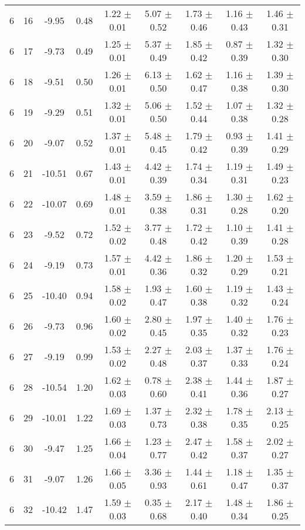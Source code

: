 \begin{landscape}
\begin{longtable}{ccccccccc}
   6 & 16 & -9.95 & 0.48 & 1.22 $\pm$ 0.01 & 5.07 $\pm$ 0.52 & 1.73 $\pm$ 0.46 & 1.16 $\pm$ 0.43 & 1.46 $\pm$ 0.31\\
   6 & 17 & -9.73 & 0.49 & 1.25 $\pm$ 0.01 & 5.37 $\pm$ 0.49 & 1.85 $\pm$ 0.42 & 0.87 $\pm$ 0.39 & 1.32 $\pm$ 0.30\\
   6 & 18 & -9.51 & 0.50 & 1.26 $\pm$ 0.01 & 6.13 $\pm$ 0.50 & 1.62 $\pm$ 0.47 & 1.16 $\pm$ 0.38 & 1.39 $\pm$ 0.30\\
   6 & 19 & -9.29 & 0.51 & 1.32 $\pm$ 0.01 & 5.06 $\pm$ 0.50 & 1.52 $\pm$ 0.44 & 1.07 $\pm$ 0.38 & 1.32 $\pm$ 0.28\\
   6 & 20 & -9.07 & 0.52 & 1.37 $\pm$ 0.01 & 5.48 $\pm$ 0.45 & 1.79 $\pm$ 0.42 & 0.93 $\pm$ 0.39 & 1.41 $\pm$ 0.29\\
   6 & 21 & -10.51 & 0.67 & 1.43 $\pm$ 0.01 & 4.42 $\pm$ 0.39 & 1.74 $\pm$ 0.34 & 1.19 $\pm$ 0.31 & 1.49 $\pm$ 0.23\\
   6 & 22 & -10.07 & 0.69 & 1.48 $\pm$ 0.01 & 3.59 $\pm$ 0.38 & 1.86 $\pm$ 0.31 & 1.30 $\pm$ 0.28 & 1.62 $\pm$ 0.20\\
   6 & 23 & -9.52 & 0.72 & 1.52 $\pm$ 0.02 & 3.77 $\pm$ 0.48 & 1.72 $\pm$ 0.42 & 1.10 $\pm$ 0.39 & 1.41 $\pm$ 0.28\\
   6 & 24 & -9.19 & 0.73 & 1.57 $\pm$ 0.01 & 4.42 $\pm$ 0.36 & 1.86 $\pm$ 0.32 & 1.20 $\pm$ 0.29 & 1.53 $\pm$ 0.21\\
   6 & 25 & -10.40 & 0.94 & 1.58 $\pm$ 0.02 & 1.93 $\pm$ 0.47 & 1.60 $\pm$ 0.38 & 1.19 $\pm$ 0.32 & 1.43 $\pm$ 0.24\\
   6 & 26 & -9.73 & 0.96 & 1.60 $\pm$ 0.02 & 2.80 $\pm$ 0.45 & 1.97 $\pm$ 0.35 & 1.40 $\pm$ 0.32 & 1.76 $\pm$ 0.23\\
   6 & 27 & -9.19 & 0.99 & 1.53 $\pm$ 0.02 & 2.27 $\pm$ 0.48 & 2.03 $\pm$ 0.37 & 1.37 $\pm$ 0.33 & 1.76 $\pm$ 0.24\\
   6 & 28 & -10.54 & 1.20 & 1.62 $\pm$ 0.03 & 0.78 $\pm$ 0.60 & 2.38 $\pm$ 0.41 & 1.44 $\pm$ 0.36 & 1.87 $\pm$ 0.27\\
   6 & 29 & -10.01 & 1.22 & 1.69 $\pm$ 0.03 & 1.37 $\pm$ 0.73 & 2.32 $\pm$ 0.38 & 1.78 $\pm$ 0.35 & 2.13 $\pm$ 0.25\\
   6 & 30 & -9.47 & 1.25 & 1.66 $\pm$ 0.04 & 1.23 $\pm$ 0.77 & 2.47 $\pm$ 0.42 & 1.58 $\pm$ 0.37 & 2.02 $\pm$ 0.27\\
   6 & 31 & -9.07 & 1.26 & 1.66 $\pm$ 0.05 & 3.36 $\pm$ 0.93 & 1.44 $\pm$ 0.61 & 1.18 $\pm$ 0.47 & 1.35 $\pm$ 0.37\\
   6 & 32 & -10.42 & 1.47 & 1.59 $\pm$ 0.03 & 0.35 $\pm$ 0.68 & 2.17 $\pm$ 0.40 & 1.48 $\pm$ 0.34 & 1.86 $\pm$ 0.25\\

\end{longtable}
\end{landscape}
